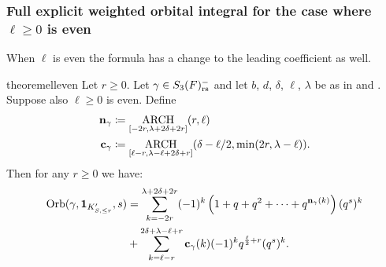 \subsubsection{Full explicit weighted orbital integral for the case where $\ell \ge 0$ is even}
When $\ell$ is even the formula has a change to the leading coefficient as well.
\begin{restatable}{theorem}{elleven}
  \label{thm:full_orbital_ell_even}
  Let $r \ge 0$.
  Let $\gamma \in S_3(F)_{\mathrm{rs}}^-$ and let $b$, $d$, $\delta$, $\ell$, $\lambda$ be as in
   and .
  Suppose also $\ell \ge 0$ is even.
  Define
  \begin{align*}
    \mathbf n_\gamma &\coloneqq \operatorname*{ARCH}_{[-2r, \lambda + 2\delta + 2r]}(r, \ell) \\
    \mathbf c_\gamma &\coloneqq \operatorname*{ARCH}_{[\ell-r, \lambda - \ell + 2\delta + r]}
    (\delta - \ell/2, \min(2r, \lambda-\ell)).
  \end{align*}
  Then for any $r \ge 0$ we have:
  \begin{align*}
    \operatorname{Orb}(\gamma, \mathbf{1}_{K'_{S, \le r}}, s)
    &= \sum_{k = -2r}^{\lambda + 2\delta +  2r}
    (-1)^k \left( 1 + q + q^2 + \dots + q^{\mathbf n_{\gamma}(k)}  \right) (q^s)^k \\
    &+ \sum_{k = \ell-r}^{2\delta + \lambda - \ell + r} \mathbf c_\gamma(k) (-1)^k q^{\frac{\ell}{2}+r} (q^s)^k.
  \end{align*}
\end{restatable}

